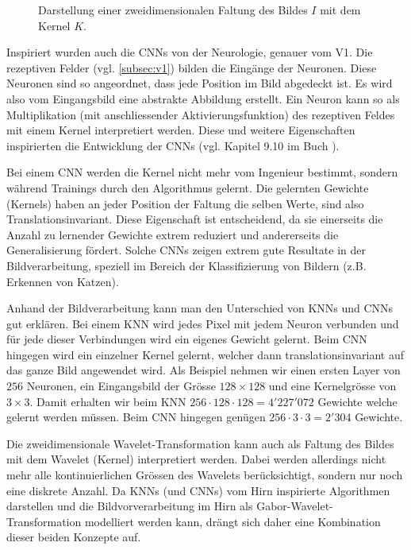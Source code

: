\begin{figure}
	\centering
	
	\caption{Darstellung einer zweidimensionalen Faltung des Bildes $I$ mit dem Kernel $K$.}
	\label{fig:2dconv}
\end{figure}

Inspiriert wurden auch die CNNs von der Neurologie, genauer vom V1.
Die rezeptiven Felder (vgl. \ref{subsec:v1}) bilden die Eingänge der Neuronen.
Diese Neuronen sind so angeordnet, dass jede Position im Bild abgedeckt ist.
Es wird also vom Eingangsbild eine abstrakte Abbildung erstellt.
Ein Neuron kann so als Multiplikation (mit anschliessender Aktivierungsfunktion) des rezeptiven Feldes mit einem Kernel interpretiert werden.
Diese und weitere Eigenschaften inspirierten die Entwicklung der CNNs (vgl. Kapitel 9.10 im Buch \cite{book:deeplearning}).

Bei einem CNN werden die Kernel nicht mehr vom Ingenieur bestimmt, sondern während Trainings durch den Algorithmus gelernt.  
Die gelernten Gewichte (Kernels) haben an jeder Position der Faltung die selben Werte, sind also Translationsinvariant.
Diese Eigenschaft ist entscheidend, da sie einerseits die Anzahl zu lernender Gewichte extrem reduziert und andererseits die Generalisierung fördert.
Solche CNNs zeigen extrem gute Resultate in der Bildverarbeitung, speziell im Bereich der Klassifizierung von Bildern (z.B. Erkennen von Katzen).

Anhand der Bildverarbeitung kann man den Unterschied von KNNs und CNNs gut erklären.
Bei einem KNN wird jedes Pixel mit jedem Neuron verbunden und für jede dieser Verbindungen wird ein eigenes Gewicht gelernt.
Beim CNN hingegen wird ein einzelner Kernel gelernt, welcher dann translationsinvariant auf das ganze Bild angewendet wird.
Als Beispiel nehmen wir einen ersten Layer von $256$ Neuronen, ein Eingangsbild der Grösse $128\times128$ und eine Kernelgrösse von $3\times3$.
Damit erhalten wir beim KNN	$256 \cdot 128 \cdot 128 = 4'227'072$ Gewichte welche gelernt werden müssen.
Beim CNN hingegen genügen $256 \cdot 3 \cdot 3 = 2'304$ Gewichte.

Die zweidimensionale Wavelet-Transformation kann auch als Faltung des Bildes mit dem Wavelet (Kernel) interpretiert werden.
Dabei werden allerdings nicht mehr alle kontinuierlichen Grössen des Wavelets berücksichtigt, sondern nur noch eine diskrete Anzahl.
Da KNNs (und CNNs) vom Hirn inspirierte Algorithmen darstellen und die Bildvorverarbeitung im Hirn als Gabor-Wavelet-Transformation modelliert werden kann, drängt sich daher eine Kombination dieser beiden Konzepte auf.

